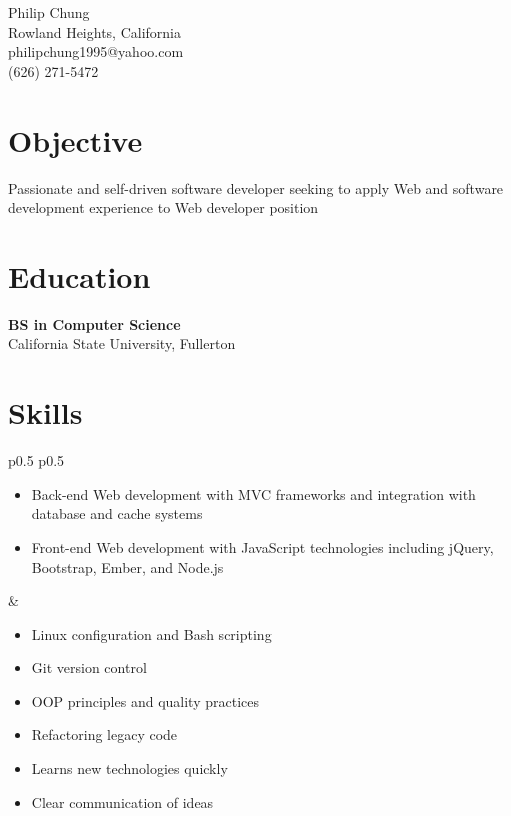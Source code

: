 \documentclass[10pt]{article}
\newcommand{\baseheader}[3]{#1 \marginpar{\raggedleft #2} \\ #3}
\begin{document}
	\begin{center}
		{\LARGE Philip Chung} \\
		Rowland Heights, California \\
		philipchung1995@yahoo.com \\
		(626) 271-5472 \\
	\end{center}

	\section*{Objective}

	Passionate and self-driven software developer seeking to apply Web and software development experience to Web developer position

	\section*{Education}

	\baseheader{\textbf{BS in Computer Science}}{1/2018}{California State University, Fullerton}

	\section*{Skills}

	\begin{tabular}{p{0.5\textwidth} p{0.5\textwidth}}
		\begin{minipage}[t]{\linewidth}
			\raggedright
			\begin{itemize}[nosep]
				\item Back-end Web development with MVC frameworks and integration with database and cache systems
				\item Front-end Web development with JavaScript technologies including jQuery, Bootstrap, Ember, and Node.js
			\end{itemize}
		\end{minipage}
		&
		\begin{minipage}[t]{\linewidth}
			\raggedright
			\begin{itemize}[nosep]
				\item Linux configuration and Bash scripting
				\item Git version control
				\item OOP principles and quality practices
				\item Refactoring legacy code
				\item Learns new technologies quickly
				\item Clear communication of ideas
			\end{itemize}
		\end{minipage}
	\end{tabular}
\end{document}
